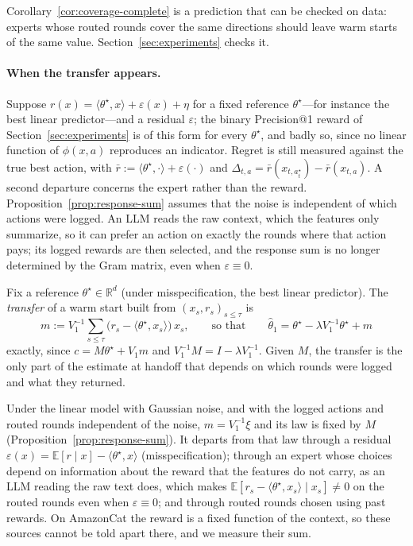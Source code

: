 \documentclass[anon]{alt2027} %
\newcommand{\R}{\mathbb{R}}
\newcommand{\E}{\mathbb{E}}
\begin{document}
Corollary~\ref{cor:coverage-complete} is a prediction that can be checked on
data: experts whose routed rounds cover the same directions should leave
warm starts of the same value. Section~\ref{sec:experiments} checks it.

\paragraph{When the transfer appears.}
Suppose $r(x)=\langle\theta^\star,x\rangle+\varepsilon(x)+\eta$ for a fixed
reference $\theta^\star$---for instance the best linear predictor---and a
residual $\varepsilon$; the binary Precision@1 reward of
Section~\ref{sec:experiments} is of this form for every $\theta^\star$, and
badly so, since no linear function of $\phi(x,a)$ reproduces an indicator.
Regret is still measured against the true best action, with
$\bar r:=\langle\theta^\star,\cdot\rangle+\varepsilon(\cdot)$ and
$\Delta_{t,a}=\bar r(x_{t,a^\star_t})-\bar r(x_{t,a})$. A second departure concerns the expert
rather than the reward. Proposition~\ref{prop:response-sum} assumes that the
noise is independent of which actions were logged. An LLM reads the raw
context, which the features only summarize, so it can prefer an action on
exactly the rounds where that action pays; its logged rewards are then
selected, and the response sum is no longer determined by the Gram matrix,
even when $\varepsilon\equiv0$.

\begin{definition}
\label{prop:transfer}
Fix a reference $\theta^\star\in\R^d$ (under misspecification, the best linear
predictor). The \emph{transfer} of a warm start built from
$(x_s,r_s)_{s\le\tau}$ is
\[
m:=V_1^{-1}\sum_{s\le\tau}\bigl(r_s-\langle\theta^\star,x_s\rangle\bigr)\,x_s,
\qquad\text{so that}\qquad
\widehat\theta_1=\theta^\star-\lambda V_1^{-1}\theta^\star+m
\]
exactly, since $c=M\theta^\star+V_1m$ and $V_1^{-1}M=I-\lambda V_1^{-1}$.
Given $M$, the transfer is the only part of the estimate at handoff that
depends on which rounds were logged and what they returned.
\end{definition}

Under the linear model with Gaussian noise, and with the logged actions and
routed rounds independent of the noise, $m=V_1^{-1}\xi$ and its law is fixed
by $M$ (Proposition~\ref{prop:response-sum}). It departs from that law
through a residual $\varepsilon(x)=\E[r\mid x]-\langle\theta^\star,x\rangle$
(misspecification); through an expert whose choices depend on information
about the reward that the features do not carry, as an LLM reading the raw
text does, which makes $\E[r_s-\langle\theta^\star,x_s\rangle\mid x_s]\ne0$ on
the routed rounds even when $\varepsilon\equiv0$; and through routed rounds
chosen using past rewards. On AmazonCat the reward is a fixed function of the
context, so these sources cannot be told apart there, and we measure their sum.
\end{document}
